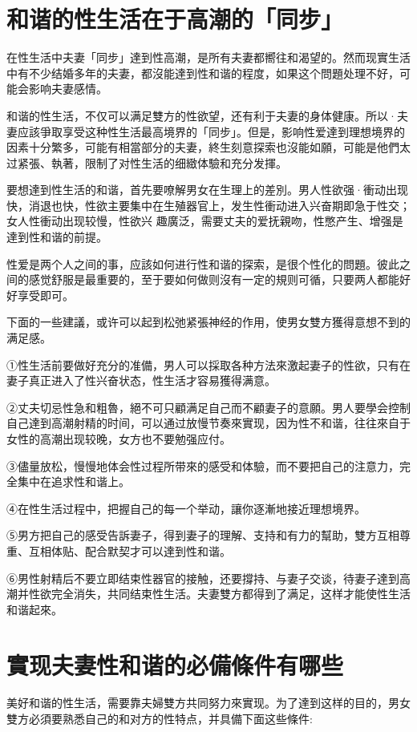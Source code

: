 \documentclass[12pt,UTF8]{ctexbook}
\begin{document}
\section{和谐的性生活在于高潮的「同步」}

在性生活中夫妻「同步」達到性高潮，是所有夫妻都嚮往和渴望的。然而现實生活中有不少结婚多年的夫妻，都沒能達到性和谐的程度，如果这个問題处理不好，可能会影响夫妻感情。

和谐的性生活，不仅可以满足雙方的性欲望，还有利于夫妻的身体健康。所以·夫妻应該爭取享受这种性生活最高境界的「同步」。但是，影响性爱達到理想境界的因素十分繁多，可能有相當部分的夫妻，終生刻意探索也沒能如願，可能是他們太过紧張、執著，限制了对性生活的细緻体驗和充分发揮。

要想達到性生活的和谐，首先要嘹解男女在生理上的差別。男人性欲强·衝动出现快，消退也快，性欲主要集中在生殖器官上，发生性衝动进入兴奋期即急于性交；女人性衝动出现较慢，性欲兴
趣廣泛，需要丈夫的爱抚親吻，性憋产生、增强是達到性和谐的前提。

性爱是两个人之间的事，应該如何进行性和谐的探索，是很个性化的問題。彼此之间的感觉舒服是最重要的，至于要如何做则沒有一定的規则可循，只要两人都能好好享受即可。

下面的一些建議，或许可以起到松弛紧張神经的作用，使男女雙方獲得意想不到的满足感。

①性生活前要做好充分的准備，男人可以採取各种方法來激起妻子的性欲，只有在妻子真正进入了性兴奋状态，性生活才容易獲得满意。

②丈夫切忌性急和粗魯，絕不可只顧满足自己而不顧妻子的意願。男人要學会控制自己達到高潮射精的时间，可以通过放慢节奏來實现，因为性不和谐，往往來自于女性的高潮出现较晚，女方也不要勉强应付。

③儘量放松，慢慢地体会性过程所带來的感受和体驗，而不要把自己的注意力，完全集中在追求性和谐上。

④在性生活过程中，把握自己的每一个举动，讓你逐漸地接近理想境界。

⑤男方把自己的感受告訴妻子，得到妻子的理解、支持和有力的幫助，雙方互相尊重、互相体贴、配合默契才可以達到性和谐。

⑥男性射精后不要立即结束性器官的接触，还要撐持、与妻子交谈，待妻子達到高潮并性欲完全消失，共同结束性生活。夫妻雙方都得到了满足，这样才能使性生活和谐起來。

\section{實现夫妻性和谐的必備條件有哪些}

美好和谐的性生活，需要靠夫婦雙方共同努力來實现。为了達到这样的目的，男女雙方必須要熟悉自己的和对方的性特点，并具備下面这些條件:
\end{document}
